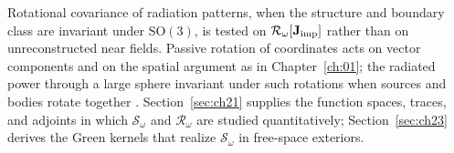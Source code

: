 Rotational covariance of radiation patterns, when the structure and boundary class are invariant under $\mathrm{SO}(3)$, is tested on $\mathcal{R}_\omega[\mathbf{J}_{\mathrm{imp}}]$ rather than on unreconstructed near fields. Passive rotation of coordinates acts on vector components and on the spatial argument as in Chapter~\ref{ch:01}; the radiated power through a large sphere invariant under such rotations when sources and bodies rotate together \cite{stratton1941}. Section~\ref{sec:ch21} supplies the function spaces, traces, and adjoints in which $\mathcal{S}_\omega$ and $\mathcal{R}_\omega$ are studied quantitatively; Section~\ref{sec:ch23} derives the Green kernels that realize $\mathcal{S}_\omega$ in free-space exteriors.